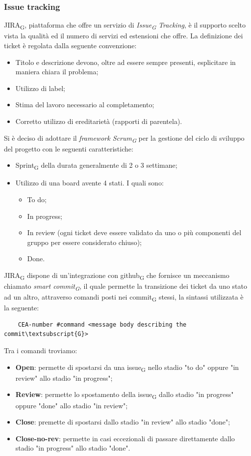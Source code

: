 	\subsubsection{Issue tracking}
	JIRA\textsubscript{G}, piattaforma che offre un servizio di \textit{Issue\textsubscript{G} Tracking}, è il supporto scelto vista la qualità ed il numero di servizi ed estensioni che offre.
	\newline
	La definizione dei ticket è regolata dalla seguente convenzione:
	\begin{itemize}
		\item Titolo e descrizione devono, oltre ad essere sempre presenti, esplicitare in maniera chiara il problema;
		\item Utilizzo di label;
		\item Stima del lavoro necessario al completamento;
		\item Corretto utilizzo di ereditarietà (rapporti di parentela).
	\end{itemize}
	Si è deciso di adottare il \textit{framework Scrum\textsubscript{G}} per la gestione del ciclo di sviluppo del progetto con le seguenti caratteristiche:
	\begin{itemize}
		\item Sprint\textsubscript{G} della durata generalmente di 2 o 3 settimane;
		\item Utilizzo di una board avente 4 stati.
		I quali sono:
		\begin{itemize}
			\item To do;
			\item In progress;
			\item In review (ogni ticket deve essere validato da uno o più componenti del gruppo per essere considerato chiuso);
			\item Done.
		\end{itemize}
	\end{itemize}

	JIRA\textsubscript{G} dispone di un'integrazione con github\textsubscript{G} che fornisce un meccanismo chiamato \textit{smart commit\textsubscript{G}}, il quale permette la transizione dei ticket da uno stato ad un altro, attraverso comandi posti nei commit\textsubscript{G} stessi, la sintassi utilizzata è la seguente:
	\begin{lstlisting}
	CEA-number #command <message body describing the commit\textsubscript{G}>
	\end{lstlisting}
	Tra i comandi troviamo:
	\begin{itemize}
		\item \textbf{Open}: permette di spostarsi da una issue\textsubscript{G} nello stadio "to do" oppure "in review" allo stadio "in progress";
		\item \textbf{Review}: permette lo spostamento della issue\textsubscript{G} dallo stadio "in progress" oppure "done" allo stadio "in review";
		\item \textbf{Close}: premette di spostarsi dallo stadio "in review" allo stadio "done";
		\item \textbf{Close-no-rev}: permette in casi eccezionali di passare direttamente dallo stadio "in progress" allo stadio "done".
	\end{itemize}
	
